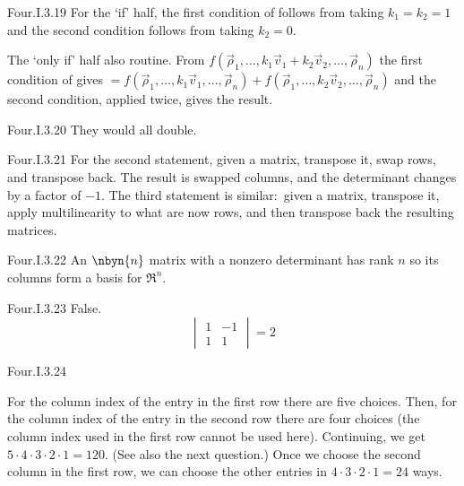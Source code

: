 \begin{ans}{Four.I.3.19}
         For the `if' half, the first condition of
          follows from taking $k_1=k_2=1$
         and the second condition follows from taking $k_2=0$.

         The `only if' half also routine.
         From
         $
           f(\vec{\rho}_1,\dots,k_1\vec{v}_1+k_2\vec{v}_2,
             \dots,\vec{\rho}_n)
         $
         the first condition of  gives
         $
           =
           f(\vec{\rho}_1,\dots,k_1\vec{v}_1,\dots,\vec{\rho}_n)+
           f(\vec{\rho}_1,\dots,k_2\vec{v}_2,\dots,\vec{\rho}_n)
         $
         and the second condition, applied twice, gives the
         result.
       
\end{ans}
\begin{ans}{Four.I.3.20}
       They would all double.
    
\end{ans}
\begin{ans}{Four.I.3.21}
      For the second statement,
      given a matrix, transpose it, swap rows, and transpose back.
      The result is swapped columns, and the determinant changes by a factor
      of \( -1 \).
      The third statement is similar:~given
      a matrix, transpose it, apply multilinearity to what are now
      rows, and then transpose back the resulting matrices.
    
\end{ans}
\begin{ans}{Four.I.3.22}
      An \( \nbyn{n} \) matrix with a nonzero determinant has rank
      \( n \) so its columns form a basis for \( \Re^n \).
    
\end{ans}
\begin{ans}{Four.I.3.23}
      False.
      \begin{equation*}
        \begin{vmatrix}
          1  &-1  \\
          1  &1
        \end{vmatrix}
        =2
      \end{equation*}
     
\end{ans}
\begin{ans}{Four.I.3.24}
      \begin{exparts}
        \partsitem For the column index of the entry in the first row there are
          five choices.
          Then, for the column index of the entry in the second row there
          are four choices (the column index used in the first row cannot
          be used here).
          Continuing, we get $5\cdot 4\cdot 3\cdot 2\cdot 1=120$.
          (See also the next question.)
        \partsitem Once we choose the second column in the first row,
          we can choose the other entries in \( 4\cdot 3\cdot 2\cdot 1=24 \)
          ways.
      \end{exparts}
    
\end{ans}
